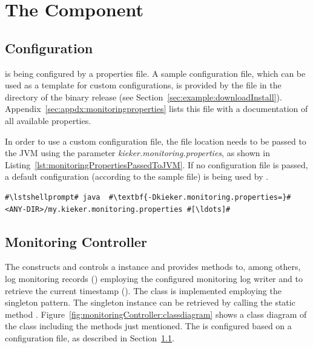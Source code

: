 % 


\chapter{The \KiekerMonitoringPart{} Component}\label{chap:componentsMonitoring}


\section{Configuration}\label{sec:monitoring:configuration}

\KiekerMonitoringPart{} is being configured by a properties file. A sample %
configuration file, which can be used as a template for custom configurations, %
is provided by the file \file{\monitoringPropertiesFile} in the directory %
 of the binary release %
(see Section~\ref{sec:example:downloadInstall}). %
Appendix~\ref{sec:appdx:monitoringproperties} lists this file with a documentation 
of all available properties.

In order to use a custom configuration file, the file location needs to be passed to %
the JVM using the parameter \textit{kieker.monitoring.properties}, as shown in %
Listing~\ref{lst:monitoringPropertiesPassedToJVM}. If no configuration file %
is passed, a default configuration (according to the sample file) is being %
used by \KiekerMonitoringPart{}. %

\setBashListing
\begin{lstlisting}[label=lst:monitoringPropertiesPassedToJVM]
#\lstshellprompt# java	#\textbf{-Dkieker.monitoring.properties=}#<ANY-DIR>/my.kieker.monitoring.properties #[\ldots]#
\end{lstlisting}

\section{Monitoring Controller}\label{sec:componentsMonitoring:monitoringController}

The  constructs and controls a \KiekerMonitoringPart{} %
instance and provides methods to, among others, log monitoring records %
() employing the configured monitoring log writer and %
to retrieve the current timestamp (). %
The class is implemented employing the singleton pattern. The singleton instance %
can be retrieved by calling the static method . %
Figure~\ref{fig:monitoringController:classdiagram} shows %
a class diagram of the class  including the methods 
just mentioned. The  is configured based on a configuration %
file, as described in Section~\ref{sec:monitoring:configuration}.


